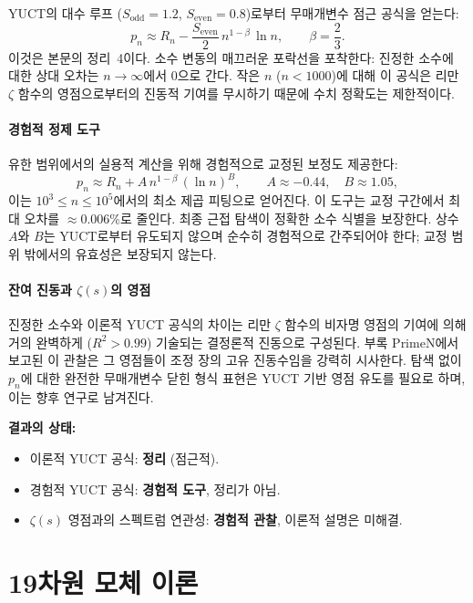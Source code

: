 \documentclass[11pt,a4paper]{article}
\begin{document}
	YUCT의 대수 루프 (\(S_{\mathrm{odd}}=1.2\), \(S_{\mathrm{even}}=0.8\))로부터 무매개변수 점근 공식을 얻는다:
	\[
	\boxed{p_n \approx R_n - \frac{S_{\mathrm{even}}}{2}\, n^{1-\beta}\,\ln n},
	\qquad \beta = \frac{2}{3}.
	\]
	이것은 본문의 정리~4이다. 소수 변동의 매끄러운 포락선을 포착한다: 진정한 소수에 대한 상대 오차는 \(n\to\infty\)에서 0으로 간다. 작은 \(n\) (\(n < 1000\))에 대해 이 공식은 리만 \(\zeta\) 함수의 영점으로부터의 진동적 기여를 무시하기 때문에 수치 정확도는 제한적이다.
	
	\subsection{경험적 정제 도구}
	
	유한 범위에서의 실용적 계산을 위해 경험적으로 교정된 보정도 제공한다:
	\[
	p_n \approx R_n + A\, n^{1-\beta}\,(\ln n)^B,
	\qquad A \approx -0.44,\quad B \approx 1.05,
	\]
	이는 \(10^3\le n\le 10^5\)에서의 최소 제곱 피팅으로 얻어진다. 이 도구는 교정 구간에서 최대 오차를 \(\approx 0.006\%\)로 줄인다. 최종 근접 탐색이 정확한 소수 식별을 보장한다. 상수 \(A\)와 \(B\)는 YUCT로부터 유도되지 않으며 순수히 경험적으로 간주되어야 한다; 교정 범위 밖에서의 유효성은 보장되지 않는다.
	
	\subsection{잔여 진동과 \(\zeta(s)\)의 영점}
	
	진정한 소수와 이론적 YUCT 공식의 차이는 리만 \(\zeta\) 함수의 비자명 영점의 기여에 의해 거의 완벽하게 (\(R^2>0.99\)) 기술되는 결정론적 진동으로 구성된다. 부록 PrimeN에서 보고된 이 관찰은 그 영점들이 조정 장의 고유 진동수임을 강력히 시사한다. 탐색 없이 \(p_n\)에 대한 완전한 무매개변수 닫힌 형식 표현은 YUCT 기반 영점 유도를 필요로 하며, 이는 향후 연구로 남겨진다.
	
	\textbf{결과의 상태:}
	\begin{itemize}
		\item 이론적 YUCT 공식: \textbf{정리} (점근적).
		\item 경험적 YUCT 공식: \textbf{경험적 도구}, 정리가 아님.
		\item \(\zeta(s)\) 영점과의 스펙트럼 연관성: \textbf{경험적 관찰}, 이론적 설명은 미해결.
	\end{itemize}
	
	\part{19차원 모체 이론}
	
\end{document}
